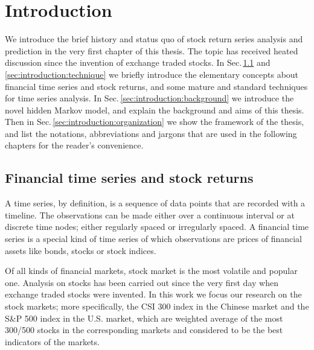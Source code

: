 
\chapter{Introduction}
\label{chap:introduction}
We introduce the brief history and status quo of stock return series analysis and prediction
in the very first chapter of this thesis.
The topic has received heated discussion since the invention of exchange traded stocks.
In Sec.\,\ref{sec:introduction:timeseries} and \ref{sec:introduction:technique}
we briefly introduce the elementary concepts about financial time series and stock returns,
and some mature and standard techniques for time series analysis.
In Sec.\,\ref{sec:introduction:background} we introduce the novel hidden Markov model,
and explain the background and aims of this thesis.
Then in Sec.\,\ref{sec:introduction:organization} we show the framework of the thesis,
and list the notations, abbreviations and jargons that are used in the following chapters
for the reader's convenience.


\section{Financial time series and stock returns}
\label{sec:introduction:timeseries}
A time series, by definition, 
is a sequence of data points that are recorded with a timeline.
The observations can be made either over a continuous interval or at discrete time nodes;
either regularly spaced or irregularly spaced.
A financial time series is a special kind of time series of which
observations are prices of financial assets like bonds, stocks or stock indices. 

Of all kinds of financial markets,
stock market is the most volatile and popular one.
Analysis on stocks has been carried out since the very first day 
when exchange traded stocks were invented.
In this work we focus our research on the stock markets;
more specifically, 
the CSI 300 index in the Chinese market and the S\&P 500 index in the U.S. market,
which are weighted average of the most 300/500 stocks in the corresponding markets 
and considered to be the best indicators of the markets.

